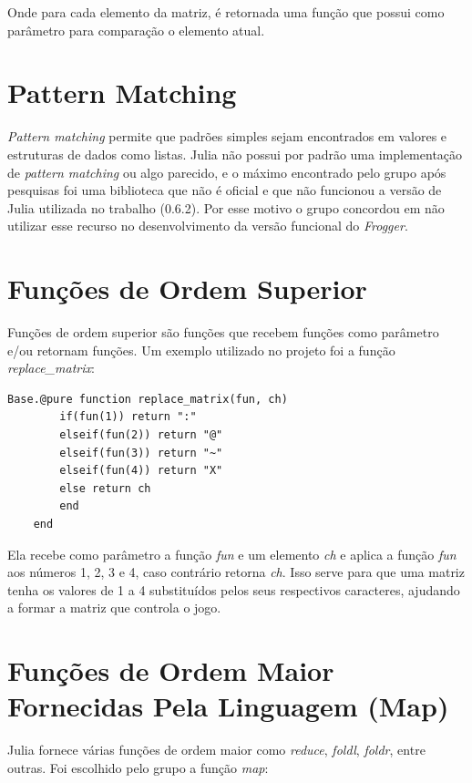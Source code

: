 \documentclass[rel_mlp]{iiufrgs}
\begin{document}
    Onde para cada elemento da matriz, é retornada uma função que possui como parâmetro para comparação o elemento atual.
    
 
 \section{Pattern Matching}
 
    \textit{Pattern matching} permite que padrões simples sejam encontrados em valores e estruturas de dados como listas.
    Julia não possui por padrão uma implementação de \textit{pattern matching} ou algo parecido, e o máximo encontrado pelo grupo após pesquisas foi uma biblioteca que não é oficial e que não funcionou a versão de Julia utilizada no trabalho (0.6.2). Por esse motivo o grupo concordou em não utilizar esse recurso no desenvolvimento da versão funcional do \textit{Frogger}.
  
 
 \section{Funções de Ordem Superior}
    
    Funções de ordem superior são funções que recebem funções como parâmetro e/ou retornam funções. Um exemplo utilizado no projeto foi a função \textit{replace\_matrix}:
  
    \begin{lstlisting}[frame=single]
    Base.@pure function replace_matrix(fun, ch)
    	if(fun(1)) return ":"
    	elseif(fun(2)) return "@"
    	elseif(fun(3)) return "~"
    	elseif(fun(4)) return "X"
    	else return ch
    	end
    end
    \end{lstlisting}
    
    Ela recebe como parâmetro a função \textit{fun} e um elemento \textit{ch} e aplica a função \textit{fun} aos números 1, 2, 3 e 4, caso contrário retorna \textit{ch}. Isso serve para que uma matriz tenha os valores de 1 a 4 substituídos pelos seus respectivos caracteres, ajudando a formar a matriz que controla o jogo.
 
 \section{Funções de Ordem Maior Fornecidas Pela Linguagem (Map)}
 
    Julia fornece várias funções de ordem maior como \textit{reduce}, \textit{foldl}, \textit{foldr}, entre outras. Foi escolhido pelo grupo a função \textit{map}:
  
\end{document}
